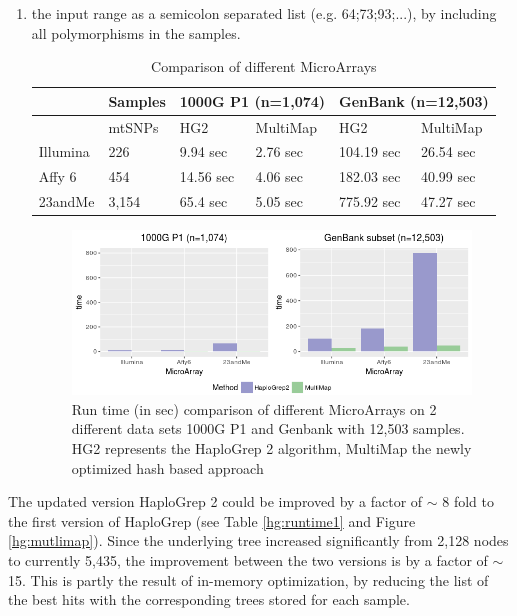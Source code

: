 \begin{enumerate}[label=(\alph*)]
\item  the input range as a semicolon separated list (e.g. 64;73;93;...), by including all polymorphisms in the samples. 

\begin{table}[H]
\centering
\caption{Comparison of different MicroArrays}
\label{hg:}
\begin{tabular}{ll|l|l|l|l|}
\cline{3-6}
                               & Samples & \multicolumn{2}{l|}{1000G P1 (n=1,074)} & \multicolumn{2}{l|}{GenBank (n=12,503)} \\ \hline
\multicolumn{1}{|l|}{}         & mtSNPs  & HG2               & MultiMap            & HG2              & MultiMap           \\ \hline
\multicolumn{1}{|l|}{Illumina} & 226     & 9.94   sec            & 2.76   sec              & 104.19   sec        & 26.54    sec          \\ \hline
\multicolumn{1}{|l|}{Affy 6}   & 454     & 14.56 sec             & 4.06   sec              & 182.03     sec      & 40.99   sec           \\ \hline
\multicolumn{1}{|l|}{23andMe}  & 3,154   & 65.4   sec            & 5.05   sec              & 775.92      sec     &       47.27    sec         \\ \hline
\end{tabular}
\end{table}
\begin{figure}[!ht]
    \centering
    \includegraphics[width=1\textwidth]{images/multimap2.png}
    \caption[Run time (in sec) comparison of HaploGrep versions]{Run time (in sec) comparison of different MicroArrays on 2 different data sets 1000G P1 and Genbank with 12,503 samples. HG2 represents the HaploGrep 2 algorithm, MultiMap the newly optimized hash based approach} 
    \label{hg:multimap2}
\end{figure}
\end{enumerate}

The updated version HaploGrep 2 could be improved by a factor of $\sim$ 8 fold to the first version of HaploGrep (see Table \ref{hg:runtime1} and Figure \ref{hg:mutlimap}). Since the underlying tree increased significantly from 2,128 nodes to currently 5,435, the improvement between the two versions is by a factor of $\sim$ 15. This is partly the result of in-memory optimization, by reducing the list of the best hits with the corresponding trees stored for each sample. 

